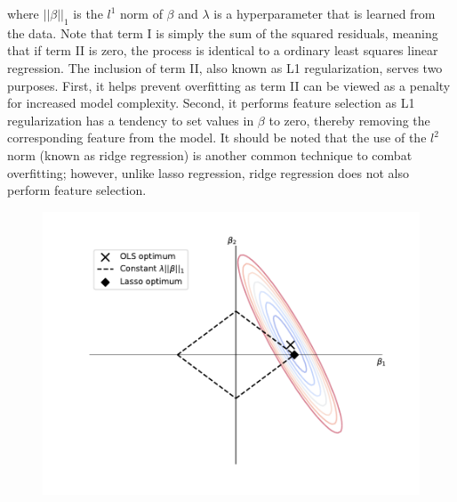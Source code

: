 \documentclass{article}
\begin{document}
\noindent where $||\beta||_1$ is the $l^1$ norm of $\beta$ and $\lambda$ is a hyperparameter that is learned from the data. Note that term I is simply the sum of the squared residuals, meaning that if term II is zero, the process is identical to a ordinary least squares linear regression. The inclusion of term II, also known as L1 regularization, serves two purposes. First, it helps prevent overfitting as term II can be viewed as a penalty for increased model complexity. Second, it performs feature selection as L1 regularization has a tendency to set values in $\beta$ to zero, thereby removing the corresponding feature from the model. It should be noted that the use of the $l^2$ norm (known as ridge regression) is another common technique to combat overfitting; however, unlike lasso regression, ridge regression does not also perform feature selection. 

\begin{figure}[htb] \centering
\includegraphics[width=.75\textwidth]{./figures/lasso_graphic.pdf}
\caption{}
\label{fig:lasso_graphic}
\end{figure}
\end{document}
